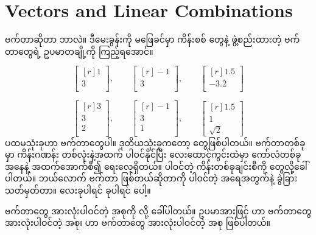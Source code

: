 \chapter{Vectors and Linear Combinations} \label{ch:ch01}

 ဗက်တာဆိုတာ ဘာလဲ။ ဒီမေးခွန်းကို မဖြေခင်မှာ ကိန်းစစ်  တွေနဲ့ ဖွဲ့စည်းထားတဲ့ ဗက်တာတွေရဲ့ ဥပမာတချို့ကို ကြည့်ရအောင်။ 

\[
\begin{bmatrix*}[r] 1\\ 3\\ \end{bmatrix*}, \qquad
\begin{bmatrix*}[r] -1\\ 3\\ \end{bmatrix*}, \qquad
\begin{bmatrix*}[r] 1.5\\ -3.2\\ \end{bmatrix*}
\]

\[
\begin{bmatrix*}[r] 3\\ 3\\ 2\\\end{bmatrix*}, \qquad
\begin{bmatrix*}[r] -1\\ 3\\ 1\\\end{bmatrix*}, \qquad
\begin{bmatrix*}[r] 1.5\\ 1\\ \sqrt{2}\end{bmatrix*}
\]
ပထမသုံးခုဟာ  ဗက်တာတွေပါ။ ဒုတိယသုံးခုကတော့  တွေဖြစ်ပါတယ်။ ဗက်တာတစ်ခုမှာ ကိန်းဂဏန်း တစ်လုံးနဲ့အထက် ပါဝင်နိုင်ပြီး လေးထောင့်ကွင်းထဲမှာ ကော်လံတစ်ခုအနေနဲ့ အထက်အောက်စီ၍ ရေးလေ့ရှိတယ်။ ပါဝင်တဲ့ ကိန်းတစ်ခုချင်းစီကို  တွေလို့ခေါ်ပါတယ်။ ဘယ်လောက်  ဗက်တာ ဖြစ်တယ်ဆိုတာကို ပါဝင်တဲ့  အရေအတွက်နဲ့ ခွဲခြားသတ်မှတ်တာ။  လေးခုပါရင်   ခုပါရင်  ပေါ့။ 

 ဗက်တာတွေ အားလုံးပါဝင်တဲ့ အစုကို  လို့ ခေါ်ပါတယ်။ ဥပမာအားဖြင့်  ဟာ  ဗက်တာတွေ အားလုံးပါဝင်တဲ့ အစု၊  ဟာ  ဗက်တာတွေ အားလုံးပါဝင်တဲ့ အစု ဖြစ်ပါတယ်။ 

